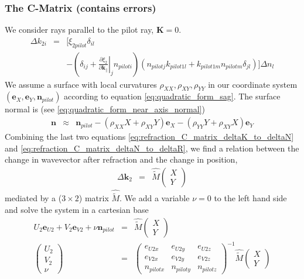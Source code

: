 \documentclass[12pt,a4paper,twoside,openright,BCOR10mm,headsepline,titlepage,abstracton,chapterprefix,final]{scrreprt}
\newcommand\Vector[1]{{\mathbf{#1}}}
\newcommand\wavenumber{k}
\newcommand\Wavevector{\Vector{\wavenumber}}
\begin{document}
\subsubsection{The C-Matrix (contains errors)}
We consider rays parallel to the pilot ray, $\Vector{K} = 0$.
\begin{eqnarray}
 \Delta \wavenumber_{2i} &=& 
 \Bigg[
     \xi_{2 pilot} \delta_{il} \nonumber\\
 &&- 
     \left( 
       \delta_{ij}
       + \left. \frac{\partial \xi_2}{\partial \Wavevector_{\parallel}} \right|_j n_{pilot i}
     \right) 
     ( n_{pilot j} \wavenumber_{pilot1 l} + \wavenumber_{pilot1 m}   n_{pilot m} \delta_{jl}) 
   \Bigg] \Delta n_l
   \label{eq:refraction_C_matrix_deltaK_to_deltaN}
\end{eqnarray}
We assume a surface with local curvatures $\rho_{XX}, \rho_{XY}, \rho_{YY}$ in our coordinate system
$(\Vector{e}_X, \Vector{e}_Y, \Vector{n}_{pilot})$ according to equation \eqref{eq:quadratic_form_sag}.
The surface normal is (see \eqref{eq:quadratic_form_near_axis_normal})
\begin{eqnarray}
 \Vector{n} &\approx& 
 \Vector{n}_{pilot}
 - (\rho_{XX} X + \rho_{XY} Y) \Vector{e}_X
 - (\rho_{YY} Y + \rho_{XY} X) \Vector{e}_Y
 \label{eq:refraction_C_matrix_deltaN_to_deltaR}
\end{eqnarray}
Combining the last two equations \eqref{eq:refraction_C_matrix_deltaK_to_deltaN} and \eqref{eq:refraction_C_matrix_deltaN_to_deltaR},
we find a relation between the change in wavevector after refraction and the change in position,
\begin{eqnarray}
 \Delta \Wavevector_2 &=& 
 \hat{\tilde{M}}
 \begin{pmatrix}
  X \\ Y
 \end{pmatrix}
\end{eqnarray}
mediated by a ($3\times2$) matrix $\hat{\tilde{M}}$.
We add a variable $\nu=0$ to the left hand side and solve the system in a cartesian base
\begin{eqnarray}
   U_2 \Vector{e}_{U2}
 + V_2 \Vector{e}_{V2}
 + \nu \Vector{n}_{pilot}
 &=& 
 \hat{\tilde{M}}
 \begin{pmatrix}
  X \\ Y
 \end{pmatrix}
 \\
 \begin{pmatrix}
  U_2 \\ V_2 \\ \nu
 \end{pmatrix}
 &=&
 \begin{pmatrix}
  e_{U2x} & e_{U2y} & e_{U2z} \\
  e_{V2x} & e_{V2y} & e_{V2z} \\
  n_{pilot x} & n_{pilot y} & n_{pilot z}
 \end{pmatrix}^{-1}
 \hat{\tilde{M}}
 \begin{pmatrix}
  X \\ Y
 \end{pmatrix}
\end{eqnarray}
\end{document}
